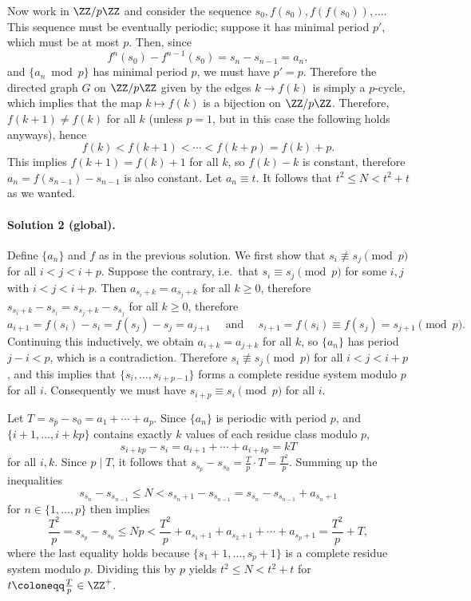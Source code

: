 Now work in $\ZZ/p\ZZ$ and consider the sequence
$s_0, f(s_0), f(f(s_0)), \dots$.
This sequence must be eventually periodic;
suppose it has minimal period $p'$, which must be at most $p$.
Then, since
\[ f^{n}(s_0) - f^{n-1}(s_0) = s_{n} - s_{n-1} = a_n, \]
and $\{a_n\bmod p\}$ has minimal period $p$, we must have $p' = p$.
Therefore the directed graph $G$ on $\ZZ/p\ZZ$
given by the edges $k\to f(k)$ is simply a $p$-cycle,
which implies that the map $k\mapsto f(k)$ is a bijection on $\ZZ/p\ZZ$.
Therefore, $f(k+1)\neq f(k)$ for all $k$
(unless $p=1$, but in this case the following holds anyways), hence
\[ f(k) < f(k+1) < \dotsb < f(k+p) = f(k) + p. \]
This implies $f(k+1) = f(k)+1$ for all $k$, so $f(k)-k$ is constant,
therefore $a_n = f(s_{n-1})-s_{n-1}$ is also constant.
Let $a_n\equiv t$. It follows that $t^2\le N < t^2+t$ as we wanted.

\paragraph{Solution 2 (global).}
Define $\{a_n\}$ and $f$ as in the previous solution.
We first show that $s_i \not\equiv s_j\pmod p$ for all $i < j < i+p$.
Suppose the contrary, i.e.\ that $s_i \equiv s_j\pmod p$
for some $i,j$ with $i < j < i+p$.
Then $a_{s_i+k} = a_{s_j+k}$ for all $k \ge 0$,
therefore $s_{s_i+k} - s_{s_i} = s_{s_j+k} - s_{s_j}$ for all $k\ge 0$,
therefore
\[ a_{i+1} = f(s_i) - s_i = f(s_j) - s_j = a_{j+1}
  \quad\text{ and }\quad
  s_{i+1} = f(s_i)\equiv f(s_j) = s_{j+1}\pmod p. \]
Continuing this inductively, we obtain $a_{i+k} = a_{j+k}$ for all $k$,
so $\{a_n\}$ has period $j-i < p$, which is a contradiction.
Therefore $s_i \not\equiv s_j\pmod p$ for all $i < j < i+p$,
and this implies that $\{s_i, \dots, s_{i+p-1}\}$ forms a
complete residue system modulo $p$ for all $i$.
Consequently we must have $s_{i+p} \equiv s_i\pmod p$ for all $i$.

Let $T = s_p - s_0 = a_1 + \dotsb + a_p$.
Since $\{a_n\}$ is periodic with period $p$, and $\{i+1,\dots,i+kp\}$
contains exactly $k$ values of each residue class modulo $p$,
\[ s_{i+kp} - s_i = a_{i+1} + \dotsb + a_{i+kp} = kT \] for all $i,k$.
Since $p\mid T$, it follows that
$s_{s_p} - s_{s_0} = \frac Tp\cdot T = \frac{T^2}{p}$.
Summing up the inequalities
\[ s_{s_n} - s_{s_{n-1}}
  \le N < s_{s_n+1} - s_{s_{n-1}} = s_{s_n} - s_{s_{n-1}} + a_{s_n+1} \]
for $n\in\{1,\dots,p\}$ then implies
\[ \frac{T^2}{p} = s_{s_p} - s_{s_0} \le Np
  < \frac{T^2}{p} + a_{s_1+1} + a_{s_2+1} + \dotsb + a_{s_p+1}
  = \frac{T^2}{p} + T, \]
where the last equality holds because $\{s_1+1,\dots,s_p+1\}$
is a complete residue system modulo $p$.
Dividing this by $p$ yields $t^2\le N < t^2+t$ for
$t \coloneqq \frac Tp\in\ZZ^+$.

